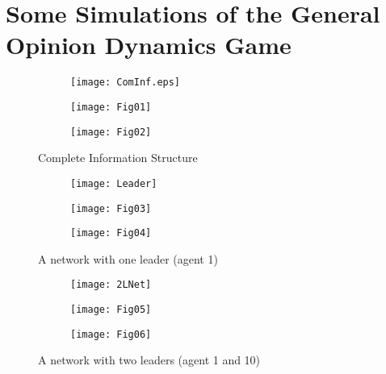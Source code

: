 \documentclass[10pt, conference, compsocconf]{IEEEtran}
\begin{document}
\section{Some Simulations of the General Opinion Dynamics Game}

\begin{figure}[h]
	\centering
	\begin{subfigure}[b]{0.5\textwidth}
		\centering
		\texttt{[image: ComInf.eps]}
		\caption{}
		\label{Fig1:G1}
	\end{subfigure}
	\begin{subfigure}[b]{0.35\textwidth}
		\centering
		\texttt{[image: Fig01]}
		\caption{}
		\label{Fig1:01}
	\end{subfigure}
	\begin{subfigure}[b]{0.35\textwidth}
		\centering
		\texttt{[image: Fig02]}
		\caption{}
		\label{Fig1:02}
	\end{subfigure}

	\caption{Complete Information Structure}
	\label{Fig1}
\end{figure}
\begin{figure}[h]
	\centering
	\begin{subfigure}[b]{0.5\textwidth}
		\centering
		\texttt{[image: Leader]}
		\caption{}
		\label{Fig2:G2}
	\end{subfigure}
	\begin{subfigure}[b]{0.35\textwidth}
		\centering
		\texttt{[image: Fig03]}
		\caption{}
		\label{Fig2:01}
	\end{subfigure}
	\begin{subfigure}[b]{0.35\textwidth}
		\centering
		\texttt{[image: Fig04]}
		\caption{}
		\label{Fig2:02}
	\end{subfigure}
	\caption{A network with one leader (agent 1)}
	\label{Fig2}
\end{figure}
\begin{figure}[h]
	\centering
	\begin{subfigure}[b]{0.5\textwidth}
		\centering
		\texttt{[image: 2LNet]}
		\caption{}
		\label{Fig3:G3}
	\end{subfigure}
	\begin{subfigure}[b]{0.35\textwidth}
		\centering
		\texttt{[image: Fig05]}
		\caption{}
		\label{Fig3:01}
	\end{subfigure}
	\begin{subfigure}[b]{0.35\textwidth}
		\centering
		\texttt{[image: Fig06]}
		\caption{}
		\label{Fig3:02}
	\end{subfigure}
	\caption{A network with two leaders (agent 1 and 10)}
	\label{Fig3}
\end{figure}
\end{document}
